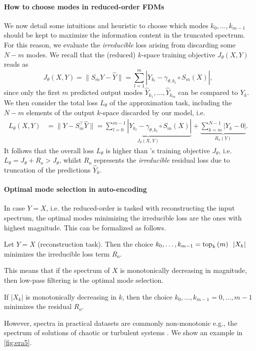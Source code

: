 \clearpage
\paragraph{How to choose modes in reduced-order FDMs} We now detail some intuitions and heuristic to choose which modes $k_0, \dots, k_{m-1}$ should be kept to maximize the information content in the truncated spectrum. For this reason, we evaluate the \textit{irreducible} loss arising from discarding some $N-m$ modes. We recall that the (reduced) $k$-space training objective $J_\theta(X, Y)$ reads as
%
\[
    J_\theta(X, Y) = \|S_m Y - \hat Y\| = \sum_{l=1}^{m}\left|Y_{k_l} - \gamma_{\theta,k_l}\circ S_m(X)\right|,
\]
%
since only the first $m$ predicted output modes $\hat Y_{k_1},\dots, \hat Y_{k_m}$ can be compared to $Y_k$. We then consider the total loss $L_\theta$ of the approximation task, including the $N-m$ elements of the output $k$-space discarded by our model, i.e.
%
\[
    \begin{aligned}
        L_\theta(X, Y) &= \|Y - S^\top_m \hat Y\|= \underbrace{\sum_{l=0}^{m-1}\left|Y_{k_l} - \gamma_{\theta,k_l}\circ S_m(X)\right|}_{J_\theta(X, Y)} + \underbrace{\sum_{k=m}^{N-1}|Y_k - 0|}_{R_o(Y)}.
    \end{aligned}
\]
%
It follows that the overall loss $L_\theta$ is higher than \ourmethod{}'s training objective $J_\theta$, i.e. $L_\theta = J_\theta + R_o > J_\theta$,
whilst $R_o$ represents the \textit{irreducible} residual loss due to truncation of the predictions $\hat Y_k$. 
%
\paragraph{Optimal mode selection in auto-encoding \ourmethod{}} In case $Y = X$, i.e. the reduced-order \ourmethod{} is tasked with reconstructing the input spectrum, the optimal modes minimizing the irreducible loss are the ones with highest magnitude. This can be formalized as follows.
%
\begin{proposition}
    Let $Y = X$ (reconstruction task). Then the choice ${k_0,\dots, k_{m-1}} = \operatorname*{top}_k{(m)}~~|X_{k}|$ minimizes the irreducible loss term $R_o$. %

\end{proposition}
%
This means that if the spectrum of $X$ is monotonically decreasing in magnitude, then low-pass filtering is the optimal mode selection.
%
\begin{corollary} If $|X_k|$ is monotonically decreasing in $k$, then the choice $k_0,\dots,k_{m-1} = 0,\dots, m-1$ minimizes the residual $R_o$.
\end{corollary}
%
However, spectra in practical datasets are commonly non-monotonic e.g., the spectrum of solutions of chaotic or turbulent systems \citep{dumont1988characteristics}. We show an example in \cref{fig:era5}.


